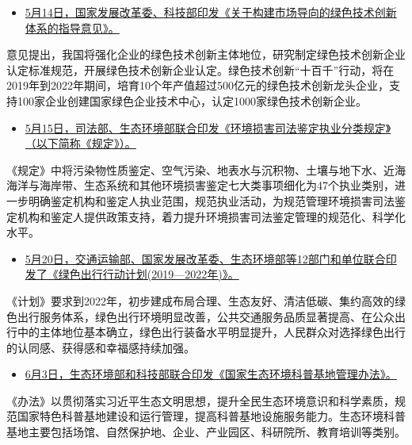 \documentclass[]{book}
\providecommand{\tightlist}{%
  \setlength{\itemsep}{0pt}\setlength{\parskip}{0pt}}
\begin{document}
\begin{itemize}
\tightlist
\item
  \href{http://www.gov.cn/xinwen/2019-05/14/content_5391394.htm}{5月14日，国家发展改革委、科技部印发《关于构建市场导向的绿色技术创新体系的指导意见》。}
\end{itemize}

意见提出，我国将强化企业的绿色技术创新主体地位，研究制定绿色技术创新企业认定标准规范，开展绿色技术创新企业认定。绿色技术创新``十百千''行动，将在2019年到2022年期间，培育10个年产值超过500亿元的绿色技术创新龙头企业，支持100家企业创建国家绿色企业技术中心，认定1000家绿色技术创新企业。

\begin{itemize}
\tightlist
\item
  \href{http://www.moj.gov.cn/government_public/content/2019-05/15/tzwj_234898.html}{5月15日，司法部、生态环境部联合印发《环境损害司法鉴定执业分类规定》（以下简称《规定》）。}
\end{itemize}

《规定》中将污染物性质鉴定、空气污染、地表水与沉积物、土壤与地下水、近海海洋与海岸带、生态系统和其他环境损害鉴定七大类事项细化为47个执业类别，进一步明确鉴定机构和鉴定人执业范围，规范执业活动，为规范管理环境损害司法鉴定机构和鉴定人提供政策支持，着力提升环境损害司法鉴定管理的规范化、科学化水平。

\begin{itemize}
\tightlist
\item
  \href{http://www.gov.cn/xinwen/2019-06/03/content_5397034.htm}{5月20日，交通运输部、国家发展改革委、生态环境部等12部门和单位联合印发了《绿色出行行动计划(2019---2022年)》。}
\end{itemize}

《计划》要求到2022年，初步建成布局合理、生态友好、清洁低碳、集约高效的绿色出行服务体系，绿色出行环境明显改善，公共交通服务品质显著提高、在公众出行中的主体地位基本确立，绿色出行装备水平明显提升，人民群众对选择绿色出行的认同感、获得感和幸福感持续加强。

\begin{itemize}
\tightlist
\item
  \href{http://www.mee.gov.cn/xxgk2018/xxgk/xxgk04/201906/t20190612_706326.html}{6月3日，生态环境部和科技部联合印发《国家生态环境科普基地管理办法》。}
\end{itemize}

《办法》以贯彻落实习近平生态文明思想，提升全民生态环境意识和科学素质，规范国家特色科普基地建设和运行管理，提高科普基地设施服务能力。生态环境科普基地主要包括场馆、自然保护地、企业、产业园区、科研院所、教育培训等类别。
\end{document}
